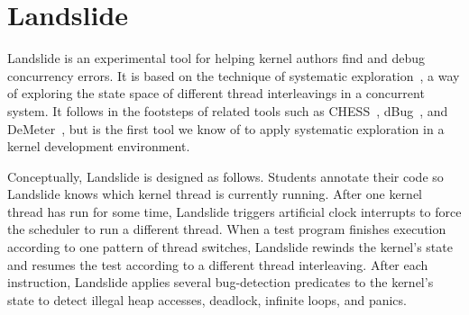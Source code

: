 \newcommand\hilight[2]{\color{#1}#2\color{black}}

\section{Landslide}
\label{sec:landslide}

Landslide is an experimental tool for helping kernel authors find and debug concurrency errors.
It is based on the technique of systematic exploration~\cite{verisoft}, a way of exploring the state space of different thread interleavings in a concurrent system.
It follows in the footsteps of related tools such as
{CHESS~\cite{chess}, dBug~\cite{dbug-ssv}, and DeMeter~\cite{demeter},}
but is the first tool we know of to apply systematic exploration in a kernel development environment.

Conceptually,
Landslide is designed as follows.
Students annotate their code so Landslide knows
which kernel thread is currently running.
After one kernel thread has run for some time,
Landslide triggers artificial clock interrupts
to force the scheduler to run a different thread.
When a test program finishes execution according
to one pattern of thread switches,
Landslide rewinds the kernel's state
and resumes the test according to a different thread interleaving.
After each instruction,
Landslide applies several bug-detection predicates to
the kernel's state to detect
illegal heap accesses,
deadlock, infinite loops, and panics.

